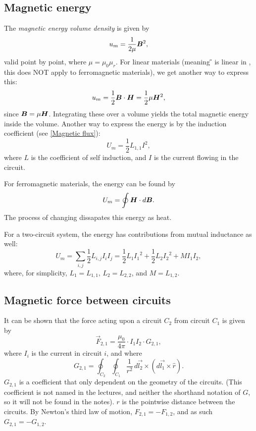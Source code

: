 \subsection{Magnetic energy}
    The \textit{magnetic energy volume density} is given by
    \begin{equation}
        u_m = \frac{1}{2\mu}\bm{B}^2,
    \end{equation}
    valid point by point, where $\mu = \mu_0 \mu_r $. 
    For linear materials (meaning \H{} is linear in \B, this does NOT apply to ferromagnetic materials), we get another way to express this: 
    \begin{equation}
        u_m = \frac{1}{2}\bm{B}\cdot\bm{H} = \frac{1}{2}\mu\bm{H}^2,
    \end{equation}
    since $\bm{B} = \mu\bm{H}{}$. Integrating these over a volume yields the total magnetic energy inside the volume.
    Another way to express the energy is by the induction coefficient (see \ref{Magnetic flux}):
    \begin{equation}
        U_m = \frac{1}{2}L_{1,1}I^2,
    \end{equation}
    where $L$ is the coefficient of self induction, and $I$ is the current flowing in the circuit.

    For ferromagnetic materials, the energy can be found by
    \begin{equation}
        U_m = \oint \bm{H} \cdot d\bm{B}.
    \end{equation}
    The process of changing \B{} dissapates this energy as heat.

    For a two-circuit system, the energy has contributions from mutual inductance as well: 
    \begin{equation}
        U_m = \sum_{i,j}\frac{1}{2}L_{i,j}I_iI_j = \frac{1}{2}L_1{I_1}^2 + \frac{1}{2}L_2{I_2}^2 + MI_1I_2,
    \end{equation}
    where, for simplicity, $L_1 = L_{1,1},\, L_2 = L_{2,2}$, and $M = L_{1,2}$.

\subsection{Magnetic force between circuits}
    It can be shown that the force acting upon a circuit $C_2$ from circuit $C_1$ is given by
    \begin{equation}
        \vec{F}_{2,1} = \frac{\mu_0}{4\pi}\cdot I_1 I_2 \cdot G_{2,1},
    \end{equation}
    where $I_i$ is the current in circuit $i$, and where 
    \begin{equation}
        G_{2,1} = \oint_{C_2} \oint_{C_1} \frac{1}{r^2}\,d\vec{l_2}\times\left(d\vec{l_1} \times \hat{r}\right).
    \end{equation}
    $G_{2,1}$ is a coefficient that only dependent on the geometry of the circuits. 
    (This coefficient is not named in the lectures, and neither the shorthand notation of $G$, so it will not be found in the notes).
    $r$ is the pointwise distance between the circuits. By Newton's third law of motion, 
    $F_{2,1} = -F_{1,2}$, and as such $G_{2,1} = - G_{1,2}$.

